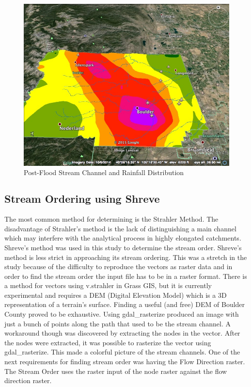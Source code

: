\documentclass[twoside]{article}
\begin{document}
\begin{multicols}{2}
\begin{figure}[H] %
\includegraphics[width=1\columnwidth]{postflood.jpg}
\caption{Post-Flood Stream Channel and Rainfall Distribution\label{fig:postflood}}
\end{figure}

\subsection{Stream Ordering using Shreve}
The most common method for determining is the Strahler Method. The disadvantage of Strahler's method is the lack of distinguishing a main channel which may interfere with the analytical process in highly elongated catchments. \cite{Strahler} Shreve's method was used in this study to determine the stream order. Shreve's method is less strict in approaching its stream ordering. This was a stretch in the study because of the difficulty to reproduce the vectors as raster data and in order to find the stream order the input file has to be in a raster format. There is a method for vectors using v.strahler in Grass GIS, but it is currently experimental and requires a DEM (Digital Elevation Model) which is a 3D representation of a terrain's surface. Finding a useful (and free) DEM of Boulder County proved to be exhaustive. Using gdal\_rasterize produced an image with just a bunch of points along the path that used to be the stream channel. A workaround though was discovered by extracting the nodes in the vector. After the nodes were extracted, it was possible to rasterize the vector using gdal\_rasterize. This made a colorful picture of the stream channels. One of the next requirements for finding stream order was having the Flow Direction raster. The Stream Order uses the raster input of the node raster against the flow direction raster. 


\end{multicols}
\end{document}
